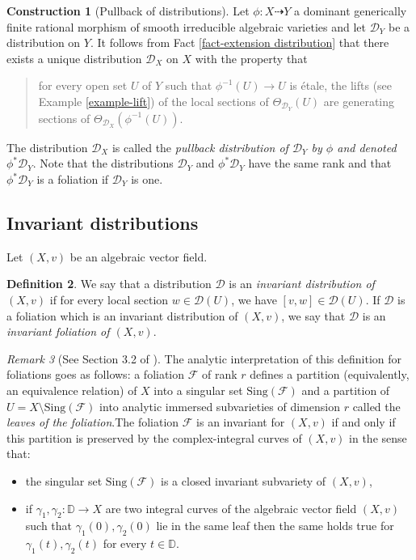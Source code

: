 \documentclass[12pt]{amsart}
\theoremstyle{definition}
\newtheorem{definition}{Definition}[subsection]
\newtheorem{construction}[definition]{Construction}
\theoremstyle{plain}
\theoremstyle{exampstyle}
\theoremstyle{exampstyle}\newtheorem{thmxbis}{Theorem}
\numberwithin{equation}{section}
\theoremstyle{remark}
\newtheorem{remark}[definition]{Remark}
\begin{document}
\begin{construction}[Pullback of distributions] Let $\phi: X \dashrightarrow Y$ a dominant generically finite rational morphism of smooth  irreducible algebraic varieties and let $\mathcal D_Y$ be a distribution on $Y$. It follows from Fact \ref{fact-extension distribution} that there exists a unique distribution $\mathcal D_X$ on $X$ with the property that
\begin{quote}
for every open set $U$ of $Y$ such that $\phi^{-1}(U) \rightarrow U$ is étale, the lifts  (see Example \ref{example-lift})  of the local sections of $\Theta_ {\mathcal D_Y}(U)$ are generating sections of $\Theta_{\mathcal D_X}(\phi^{-1}(U))$. 
\end{quote}
The distribution $\mathcal D_X$ is called the {\em pullback distribution of $\mathcal D_Y$ by $\phi$ and denoted $\phi^\ast \mathcal D_Y$}. Note that the distributions $\mathcal D_Y$ and $\phi^\ast \mathcal D_Y$ have the same rank and that $\phi^\ast \mathcal D_Y$ is a foliation if $\mathcal D_Y$ is one. 
\end{construction}
\subsection{Invariant distributions} Let $(X,v)$ be an algebraic vector field.

\begin{definition} 
We say that a distribution $\mathcal D$ is an {\em invariant distribution of $(X,v)$ } if for every local section  $w \in \mathcal D(U)$, we have $[v,w] \in \mathcal D(U)$. If $\mathcal D$ is a foliation which is an invariant distribution of $(X,v)$, we say that $\mathcal D$ is an \textit{invariant foliation of $(X,v)$}. 
\end{definition}

\begin{remark}[See Section 3.2 of \cite{jaoui-Confluentes}] The analytic interpretation of this definition for foliations goes as follows: a foliation $\mathcal F$ of rank $r$ defines a partition (equivalently, an equivalence relation) of $X$ into a singular set $\mathrm{Sing}(\mathcal F)$ and a partition of $U = X \setminus \mathrm{Sing}(\mathcal F)$ into analytic immersed subvarieties of dimension $r$ called the {\em leaves of the foliation}.The foliation $\mathcal F$ is an invariant for $(X,v)$ if and only if this partition is preserved by the complex-integral curves of $(X,v)$ in the sense that: 
\begin{itemize}
\item the singular set $\mathrm{Sing}(\mathcal F)$ is a closed invariant subvariety of $(X,v)$,
\item if $\gamma_1, \gamma_2: \mathbb{D} \rightarrow X$ are two integral curves of the algebraic vector field $(X,v)$ such that $\gamma_1(0), \gamma_2(0)$ lie in the same leaf then the same holds true for $\gamma_1(t),\gamma_2(t)$ for every $t \in \mathbb{D}$.
\end{itemize} 
\end{remark}
\end{document}
